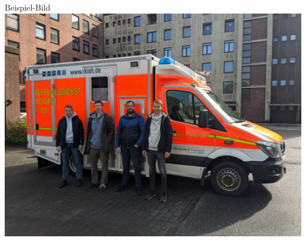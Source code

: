 \begin{frame}{Beispiel-Bild}
	\centering
	\includegraphics[height=.9\textheight]{images/PXL_20240426_144813969.jpg}
\end{frame}


%
%
\frame{\printbibliography}
